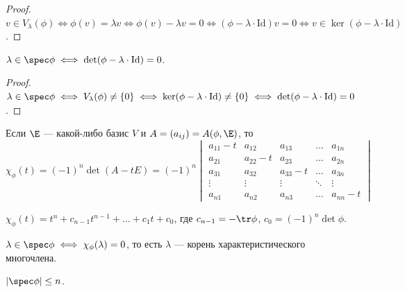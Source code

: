 \documentclass[a4paper]{article}
\begin{document}
\begin{colloq}
            \begin{proof}
                $v \in V_\lambda(\phi) \iff \phi(v) = \lambda v \iff \phi(v) - \lambda v = 0 \iff (\phi - \lambda \cdot \mathrm{Id}) v = 0 \iff v \in \ker(\phi - \lambda \cdot \mathrm{Id})$.
            \end{proof}

            \begin{corollary}
                $\lambda \in \spec \phi \iff \det (\phi - \lambda \cdot \mathrm{Id}) = 0$.
            \end{corollary}

            \begin{proof}
                $\lambda \in \spec \phi \iff V_\lambda(\phi) \neq \{0\} \iff \ker(\phi - \lambda \cdot \mathrm{Id}) \neq \{0\} \iff \det(\phi - \lambda \cdot \mathrm{Id}) = 0$.
            \end{proof}

            Если $\E$ --- какой-либо базис $V$ и $A = (a_{ij}) = A(\phi, \E)$, то
            \begin{equation*}
                \chi_\phi(t) = (-1)^n \det (A - tE) = (-1)^n \begin{vmatrix} 
                    a_{11} - t & a_{12} & a_{13} & \dots & a_{1n} \\ 
                    a_{21} & a_{22} - t & a_{23} & \dots & a_{2n} \\
                    a_{31} & a_{32} & a_{33} - t & \dots & a_{3n} \\
                    \vdots & \vdots & \vdots & \ddots & \vdots \\
                    a_{n1} & a_{n2} & a_{n3} & \dots & a_{nn} - t
                \end{vmatrix}
            \end{equation*}

            $\chi_\phi(t) = t^n + c_{n - 1}t^{n - 1} + \dots + c_1 t + c_0$, где $c_{n - 1} = -\tr \phi$, $c_0 = (-1)^n \det \phi$.

            \begin{corollary}
                $\lambda \in \spec \phi \iff \chi_\phi(\lambda) = 0$, то есть $\lambda$ --- корень характеристического многочлена.
            \end{corollary}

            \begin{corollary}
                $|\spec \phi| \leq n$.   
            \end{corollary}



\end{colloq}
\end{document}
